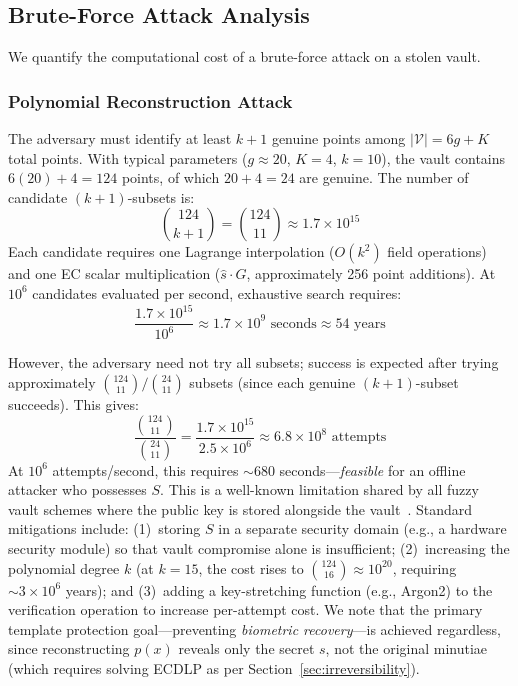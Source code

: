 \documentclass[conference]{IEEEtran}
\begin{document}
\subsection{Brute-Force Attack Analysis}
\label{sec:brute_force}

We quantify the computational cost of a brute-force attack on a stolen vault.

\subsubsection{Polynomial Reconstruction Attack}
The adversary must identify at least $k+1$ genuine points among $|\mathcal{V}| = 6g + K$ total points. With typical parameters ($g \approx 20$, $K = 4$, $k = 10$), the vault contains $6(20) + 4 = 124$ points, of which $20 + 4 = 24$ are genuine. The number of candidate $(k+1)$-subsets is:
\begin{equation}
    \binom{124}{k+1} = \binom{124}{11} \approx 1.7 \times 10^{15}
    \label{eq:brute_force}
\end{equation}
Each candidate requires one Lagrange interpolation (${O}(k^2)$ field operations) and one EC scalar multiplication ($\hat{s} \cdot G$, approximately 256 point additions). At $10^6$ candidates evaluated per second, exhaustive search requires:
\begin{equation}
    \frac{1.7 \times 10^{15}}{10^6} \approx 1.7 \times 10^{9} \text{ seconds} \approx 54 \text{ years}
\end{equation}

However, the adversary need not try all subsets; success is expected after trying approximately $\binom{124}{11} / \binom{24}{11}$ subsets (since each genuine $(k+1)$-subset succeeds). This gives:
\begin{equation}
    \frac{\binom{124}{11}}{\binom{24}{11}} = \frac{1.7 \times 10^{15}}{2.5 \times 10^{6}} \approx 6.8 \times 10^{8} \text{ attempts}
\end{equation}
At $10^6$ attempts/second, this requires $\sim\!680$ seconds---\emph{feasible} for an offline attacker who possesses $S$. This is a well-known limitation shared by all fuzzy vault schemes where the public key is stored alongside the vault~\cite{tams2013attacks,nandakumar2007fuzzy}. Standard mitigations include: (1)~storing $S$ in a separate security domain (e.g., a hardware security module) so that vault compromise alone is insufficient; (2)~increasing the polynomial degree $k$ (at $k = 15$, the cost rises to $\binom{124}{16} \approx 10^{20}$, requiring $\sim\!3 \times 10^{6}$ years); and (3)~adding a key-stretching function (e.g., Argon2) to the verification operation to increase per-attempt cost. We note that the primary template protection goal---preventing \emph{biometric recovery}---is achieved regardless, since reconstructing $p(x)$ reveals only the secret $s$, not the original minutiae (which requires solving ECDLP as per Section~\ref{sec:irreversibility}).
\end{document}
